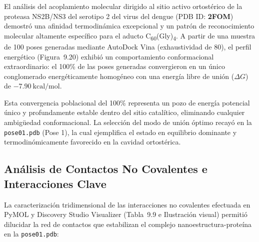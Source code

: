 El análisis del acoplamiento molecular dirigido al sitio activo ortostérico de la proteasa NS2B/NS3 del serotipo 2 del virus del dengue (PDB ID: \textbf{2FOM}) demostró una afinidad termodinámica excepcional y un patrón de reconocimiento molecular altamente específico para el aducto C\textsubscript{60}(Gly)\textsubscript{4}. A partir de una muestra de 100 poses generadas mediante AutoDock Vina (exhaustividad de 80), el perfil energético (Figura~9.20) exhibió un comportamiento conformacional extraordinario: el 100\% de las poses generadas convergieron en un único conglomerado energéticamente homogéneo con una energía libre de unión ($\Delta G$) de $-7.90\ \text{kcal/mol}$.

Esta convergencia poblacional del 100\% representa un pozo de energía potencial único y profundamente estable dentro del sitio catalítico, eliminando cualquier ambigüedad conformacional. La selección del modo de unión óptimo recayó en la \texttt{pose01.pdb} (Pose 1), la cual ejemplifica el estado en equilibrio dominante y termodinómicamente favorecido en la cavidad ortostérica.

\subsection{Análisis de Contactos No Covalentes e Interacciones Clave}

La caracterización tridimensional de las interacciones no covalentes efectuada en PyMOL y Discovery Studio Visualizer (Tabla~9.9 e Ilustración visual) permitió dilucidar la red de contactos que estabilizan el complejo nanoestructura-proteína en la \texttt{pose01.pdb}:

